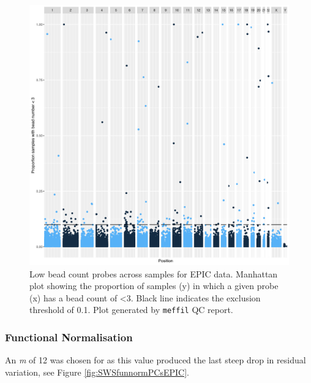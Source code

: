 \documentclass[
]{book}
\begin{document}
\begin{figure}

{\centering \includegraphics[width=0.8\linewidth]{figs/SWSqcEPICbeadNumAcross} 

}

\caption{Low bead count probes across samples for EPIC data. Manhattan plot showing the proportion of samples (y) in which a given probe (x) has a bead count of \textless3. Black line indicates the exclusion threshold of 0.1. Plot generated by \texttt{meffil} QC report.}\label{fig:SWSqcEPICbeadNumAcross}
\end{figure}



\hypertarget{functional-normalisation-3}{%
\subsubsection{Functional Normalisation}\label{functional-normalisation-3}}

An \emph{m} of 12 was chosen for as this value produced the last steep drop in residual variation, see Figure \ref{fig:SWSfunnormPCsEPIC}.
\end{document}
